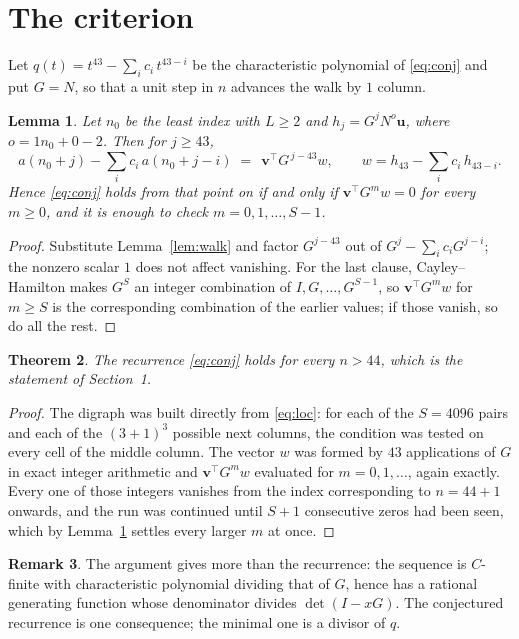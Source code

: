 \documentclass[11pt,a4paper]{article}
\theoremstyle{plain}
\newtheorem{theorem}{Theorem}
\newtheorem{lemma}[theorem]{Lemma}
\theoremstyle{definition}
\newtheorem{remark}[theorem]{Remark}
\begin{document}
\section{The criterion}

Let $q(t)=t^{43}-\sum_i c_i\,t^{43-i}$ be the characteristic polynomial of
\eqref{eq:conj} and put $G=N$, so that a unit step in $n$ advances the walk by
$1$ column.

\begin{lemma}\label{lem:crit}
Let $n_0$ be the least index with $L\ge2$ and $h_j=G^{j}N^{o}\mathbf{u}$, where
$o=1n_0+0-2$. Then for $j\ge43$,
\[
a(n_0+j)-\sum_i c_i\,a(n_0+j-i)\;=\;\,\mathbf{v}^{\!\top}G^{\,j-43}w,
\qquad w=h_{43}-\sum_i c_i\,h_{43-i} .
\]
Hence \eqref{eq:conj} holds from that point on if and only if
$\mathbf{v}^{\!\top}G^{m}w=0$ for every $m\ge0$, and it is enough to check
$m=0,1,\dots,S-1$.
\end{lemma}

\begin{proof}
Substitute Lemma~\ref{lem:walk} and factor $G^{j-43}$ out of
$G^{j}-\sum_ic_iG^{j-i}$; the nonzero scalar $1$ does not affect
vanishing. For the last clause, Cayley--Hamilton makes $G^{S}$ an integer combination of
$I,G,\dots,G^{S-1}$, so $\mathbf{v}^{\!\top}G^{m}w$ for $m\ge S$ is the corresponding
combination of the earlier values; if those vanish, so do all the rest.
\end{proof}

\begin{theorem}
The recurrence \eqref{eq:conj} holds for every $n>44$, which is the statement of
Section~1.
\end{theorem}

\begin{proof}
The digraph was built directly from \eqref{eq:loc}: for each of the $S=4096$ pairs and each
of the $(3+1)^{3}$ possible next columns, the condition was tested on every cell of
the middle column. The vector $w$ was formed by $43$ applications of $G$ in exact integer
arithmetic and $\mathbf{v}^{\!\top}G^{m}w$ evaluated for $m=0,1,\dots$, again exactly.
Every one of those integers vanishes from the index corresponding to $n=44+1$ onwards,
and the run was continued until $S+1$ consecutive zeros had been seen, which by
Lemma~\ref{lem:crit} settles every larger $m$ at once.
\end{proof}

\begin{remark}
The argument gives more than the recurrence: the sequence is $C$-finite with characteristic
polynomial dividing that of $G$, hence has a rational generating function whose denominator
divides $\det(I-xG)$. The conjectured recurrence is one consequence; the minimal one is a
divisor of $q$.
\end{remark}
\end{document}
